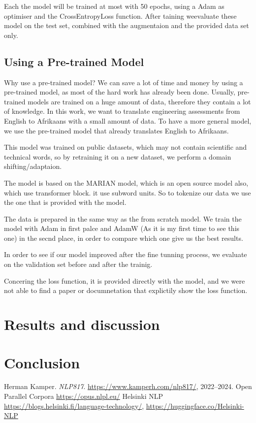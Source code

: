 Each the model will be trained at most with 50 epochs, using a Adam as optimiser and the CrossEntropyLoss function. After taining weevaluate these model on the test set, combined with the augmentaion and the provided data set only.
\subsection{Using a Pre-trained Model}
Why use a pre-trained model? We can save a lot of time and money by using a pre-trained model, as most of the hard work has already been done. Usually, pre-trained models are trained on a huge amount of data, therefore they contain a lot of knowledge. In this work, we want to translate engineering assessments from English to Afrikaans with a small amount of data. To have a more general model, we use the pre-trained model that already translates English to Afrikaans.

This model was trained on public datasets, which may not contain scientific and technical words, so by retraining it on a new dataset, we perform a domain shifting/adaptaion.

The model is based on the MARIAN model, which is an open source model also, which use transformer block. it use subword units. So to tokenize our data we use the one that is provided with the model.

The data is prepared in the same way as the from scratch model. We train the model with Adam in first palce and AdamW (As it is my first time to see this one) in the secnd place, in order to compare which one give us the best results.

In order to see if our model improved after the fine tunning process, we evaluate on the validation set before and after the trainig.


Concering the loss function, it is provided directly with the model, and we were not able to find a paper or documnetation that explictily show the loss function.


\section{Results and discussion}
\section{Conclusion}

\begin{thebibliography}{1}

 Herman Kamper. \emph{NLP817}. \href{https://www.kamperh.com/nlp817/}{https://www.kamperh.com/nlp817/}, 2022--2024.
 Open Parallel Corpora \href{https://opus.nlpl.eu/}{https://opus.nlpl.eu/}
 Helsinki NLP \href{https://blogs.helsinki.fi/language-technology/}{https://blogs.helsinki.fi/language-technology/}, \href{https://huggingface.co/Helsinki-NLP}{https://huggingface.co/Helsinki-NLP}
\end{thebibliography}